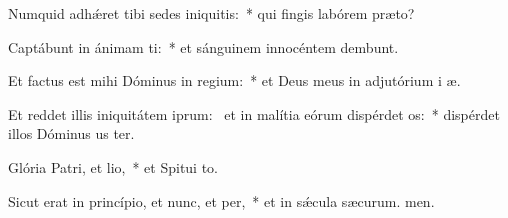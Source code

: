 \item Numquid adhǽret tibi sedes iniquitis:~* qui fingis labórem  præto?
\item Captábunt in ánimam ti:~* et sánguinem innocéntem dembunt.
\item Et factus est mihi Dóminus in regium:~* et Deus meus in adjutórium i æ.
\item Et reddet illis iniquitátem iprum:~\pscross{} et in malítia eórum dispérdet os:~* dispérdet illos Dóminus us ter.
\item Glória Patri, et lio,~* et Spitui to.
\item Sicut erat in princípio, et nunc, et per,~* et in sǽcula sæcurum. men.
